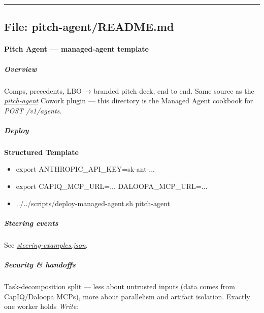 \documentclass[11pt]{article}
\begin{document}
\vspace{0.8em}\hrule\vspace{0.8em}

\subsection{File: pitch-agent/README.md}\label{file:pitch-agent-README-md}

\paragraph{Pitch Agent — managed-agent template}\mbox{}\par

\subparagraph{Overview}\mbox{}\par

Comps, precedents, LBO → branded pitch deck, end to end. Same source as the \href{../../plugins/agent-plugins/pitch-agent}{\emph{pitch-agent}} Cowork plugin — this directory is the Managed Agent cookbook for \emph{POST /v1/agents}.


\subparagraph{Deploy}\mbox{}\par

\textbf{Structured Template}
\begin{itemize}[leftmargin=*,itemsep=2pt,topsep=2pt]
\item {} export ANTHROPIC\_\allowbreak{}API\_\allowbreak{}KEY=sk-ant-...
\item {} export CAPIQ\_\allowbreak{}MCP\_\allowbreak{}URL=... DALOOPA\_\allowbreak{}MCP\_\allowbreak{}URL=...
\item {} ../../scripts/deploy-managed-agent.sh pitch-agent
\end{itemize}

\subparagraph{Steering events}\mbox{}\par

See \href{./steering-examples.json}{\emph{steering-examples.json}}.


\subparagraph{Security \& handoffs}\mbox{}\par

Task-decomposition split — less about untrusted inputs (data comes from CapIQ/Daloopa MCPs), more about parallelism and artifact isolation. Exactly one worker holds \emph{Write}:
\end{document}
